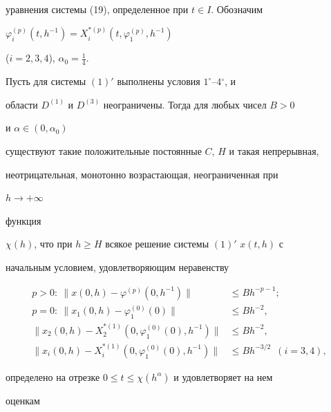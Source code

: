 уравнения системы (19), определенное при $t\in I$. Обозначим 


$\varphi^{(p)}_i(t,h^{-1})=X^{*(p)}_i(t,\varphi^{(p)}_1,h^{-1})$ 


($i=2,3,4$), $\alpha_0=\frac{1}{4}$. 


 


\begin{thm} 


Пусть для системы $(1)'$ выполнены условия $1^\circ$--$4{}^\circ$, и 


области $D^{(1)}$ и $D^{(3)}$ неограничены. Тогда для любых чисел $B>0$ 


и $\alpha\in(0,\alpha_0)$ 


существуют такие положительные постоянные $C$, $H$ и такая непрерывная, 


неотрицательная, монотонно возрастающая, неограниченная при 


$h\to+\infty$ 


функция 


$\chi(h)$, что при $h\ge H$ всякое решение системы $(1)'$ $x(t,h)$ с 


начальным условием, удовлетворяющим неравенству 


\begin{equation} 


\begin{split} 


p>0: \ \|x(0,h)-\varphi^{(p)}(0,h^{-1})\| &\le  


B h^{-p-1}; \\ 


p=0: \ \|x_1(0,h)-\varphi^{(0)}_1(0)\| &\le B h^{-2}, \\ 


\|x_2(0,h)-X^{*(1)}_2(0,\varphi^{(0)}_1(0),h^{-1})\| &\le 


B h^{-2}, \\ 


\|x_i(0,h)-X^{*(1)}_i(0,\varphi^{(0)}_1(0),h^{-1})\| &\le 


B h^{-3/2} \ \; (i=3,4), 


\end{split} 


\end{equation} 


определено на отрезке $0\le t\le\chi(h^\alpha)$ и удовлетворяет на нем 


оценкам 


\begin{equation} 



\end{equation}
\end{thm}
